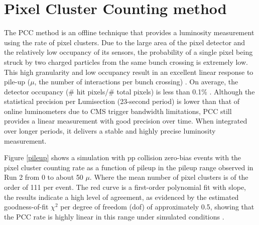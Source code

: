\section{Pixel Cluster Counting method}
\label{Pixel Cluster Counting method}

The PCC method is an offline technique that provides a luminosity measurement using the rate of pixel clusters. Due to the large area of the pixel detector and the relatively low occupancy of its sensors, the probability of a single pixel being struck by two charged particles from the same bunch crossing is extremely low. This high granularity and low occupancy result in an excellent linear response to pile-up (\(\mu\), the number of interactions per bunch crossing) \cite{PCC_PAS_12_001}. On average, the detector occupancy (# hit pixels/# total pixels) is less than 0.1\% \cite{lumi_precise_2015_2016}.  
Although the statistical precision per Lumisection (23-second period) is lower than that of online luminometers due to CMS trigger bandwidth limitations, PCC still provides a linear measurement with good precision over time. When integrated over longer periods, it delivers a stable and highly precise luminosity measurement.  

Figure \ref{pileup} shows a simulation with pp collision zero-bias events with the pixel cluster counting rate as a function of pileup in the pileup range observed in Run 2 from 0 to about 50 $\mu$. Where the mean number of pixel clusters is of the order of  111 per event. The red curve is a first-order polynomial fit with slope, the results indicate a high level of agreement, as evidenced by the estimated goodness-of-fit $\chi^{2}$ per degree of freedom (dof) of approximately 0.5, showing that the PCC rate is highly linear in this range under simulated conditions \cite{ Phase2_Upgrade,lumi_precise_2015_2016}.



